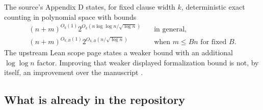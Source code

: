 \documentclass[11pt]{article}
\theoremstyle{remark}\newtheorem{remark}[theorem]{Remark}
\begin{document}
The source's Appendix D states, for fixed clause width \(k\), deterministic exact counting in polynomial space with bounds
\begin{align}
 (n+m)^{O_k(1)}2^{O_k(n\log\log n/\sqrt{\log n})}
 &\quad\text{in general},\label{eq:dense}\\
 (n+m)^{O_{k,B}(1)}2^{O_{k,B}(n/\sqrt{\log n})}
 &\quad\text{when }m\le Bn\text{ for fixed }B.\label{eq:sparse}
\end{align}
The upstream Lean scope page states a weaker bound with an additional \(\log\log n\) factor. Improving that weaker displayed formalization bound is not, by itself, an improvement over the manuscript \cite{leanscope}.

\subsection{What is already in the repository}
\footnotesize
\end{document}

